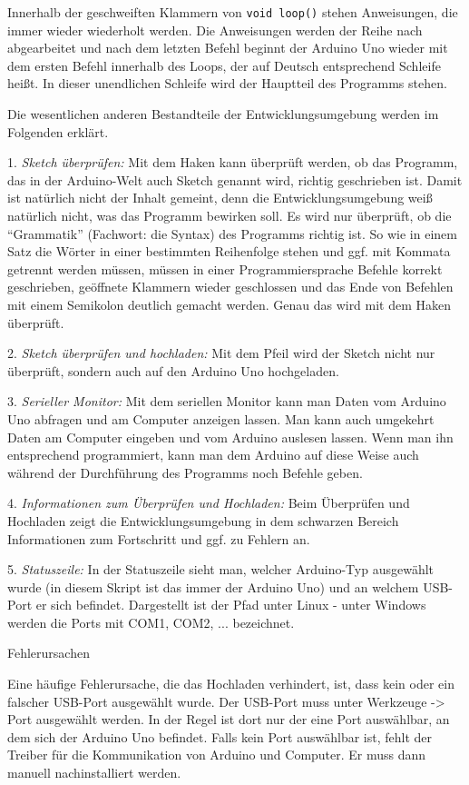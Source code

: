 Innerhalb der geschweiften Klammern von \texttt{void loop()} stehen Anweisungen, die immer wieder wiederholt werden. Die Anweisungen werden der Reihe nach abgearbeitet und nach dem letzten Befehl beginnt der Arduino Uno wieder mit dem ersten Befehl innerhalb des Loops, der auf Deutsch entsprechend Schleife heißt. In dieser unendlichen Schleife wird der Hauptteil des Programms stehen.

Die wesentlichen anderen Bestandteile der Entwicklungsumgebung werden im Folgenden erklärt.

1. \emph{Sketch überprüfen:} Mit dem Haken kann überprüft werden, ob das Programm, das in der Arduino-Welt auch Sketch genannt wird, richtig geschrieben ist. Damit ist natürlich nicht der Inhalt gemeint, denn die Entwicklungsumgebung weiß natürlich nicht, was das Programm bewirken soll. Es wird nur überprüft, ob die \enquote{Grammatik} (Fachwort: die Syntax) des Programms richtig ist. So wie in einem Satz die Wörter in einer bestimmten Reihenfolge stehen und ggf. mit Kommata getrennt werden müssen, müssen in einer Programmiersprache Befehle korrekt geschrieben, geöffnete Klammern wieder geschlossen und das Ende von Befehlen mit einem Semikolon deutlich gemacht werden. Genau das wird mit dem Haken überprüft.

2. \emph{Sketch überprüfen und hochladen:} Mit dem Pfeil wird der Sketch nicht nur überprüft, sondern auch auf den Arduino Uno hochgeladen.

3. \emph{Serieller Monitor:} Mit dem seriellen Monitor kann man Daten vom Arduino Uno abfragen und am Computer anzeigen lassen. Man kann auch umgekehrt Daten am Computer eingeben und vom Arduino auslesen lassen. Wenn man ihn entsprechend programmiert, kann man dem Arduino auf diese Weise auch während der Durchführung des Programms noch Befehle geben.

4. \emph{Informationen zum Überprüfen und Hochladen:} Beim Überprüfen und Hochladen zeigt die Entwicklungsumgebung in dem schwarzen Bereich Informationen zum Fortschritt und ggf. zu Fehlern an.

5. \emph{Statuszeile:} In der Statuszeile sieht man, welcher Arduino-Typ ausgewählt wurde (in diesem Skript ist das immer der Arduino Uno) und an welchem USB-Port er sich befindet. Dargestellt ist der Pfad unter Linux - unter Windows werden die Ports mit COM1, COM2, ... bezeichnet.

\begin{zsfg}{Fehlerursachen}
	
	Eine häufige Fehlerursache, die das Hochladen verhindert, ist, dass kein oder ein falscher USB-Port ausgewählt wurde. Der USB-Port muss unter Werkzeuge -> Port ausgewählt werden. In der Regel ist dort nur der eine Port auswählbar, an dem sich der Arduino Uno befindet. Falls kein Port auswählbar ist, fehlt der Treiber für die Kommunikation von Arduino und Computer. Er muss dann manuell nachinstalliert werden.
\end{zsfg}